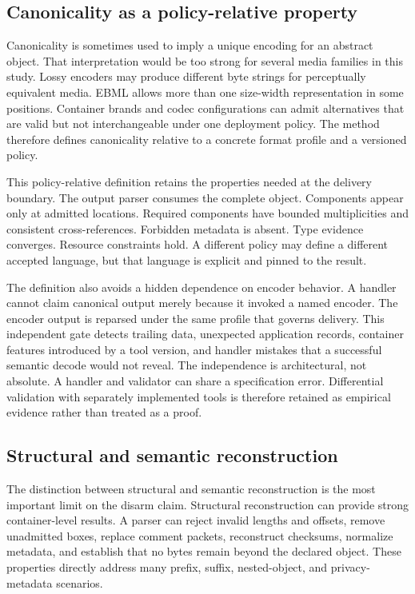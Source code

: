 \subsection{Canonicality as a policy-relative property}

Canonicality is sometimes used to imply a unique encoding for an abstract
object. That interpretation would be too strong for several media families in
this study. Lossy encoders may produce different byte strings for perceptually
equivalent media. EBML allows more than one size-width representation in some
positions. Container brands and codec configurations can admit alternatives
that are valid but not interchangeable under one deployment policy. The method
therefore defines canonicality relative to a concrete format profile and a
versioned policy.

This policy-relative definition retains the properties needed at the delivery
boundary. The output parser consumes the complete object. Components appear
only at admitted locations. Required components have bounded multiplicities and
consistent cross-references. Forbidden metadata is absent. Type evidence
converges. Resource constraints hold. A different policy may define a different
accepted language, but that language is explicit and pinned to the result.

The definition also avoids a hidden dependence on encoder behavior. A handler
cannot claim canonical output merely because it invoked a named encoder. The
encoder output is reparsed under the same profile that governs delivery. This
independent gate detects trailing data, unexpected application records,
container features introduced by a tool version, and handler mistakes that a
successful semantic decode would not reveal. The independence is architectural,
not absolute. A handler and validator can share a specification error.
Differential validation with separately implemented tools is therefore retained
as empirical evidence rather than treated as a proof.

\subsection{Structural and semantic reconstruction}

The distinction between structural and semantic reconstruction is the most
important limit on the disarm claim. Structural reconstruction can provide
strong container-level results. A parser can reject invalid lengths and
offsets, remove unadmitted boxes, replace comment packets, reconstruct checksums,
normalize metadata, and establish that no bytes remain beyond the declared object.
These properties directly address many prefix, suffix, nested-object, and
privacy-metadata scenarios.

